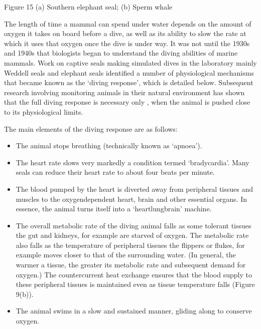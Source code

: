 \documentclass[letterpaper,10pt,english]{sphinxmanual}
\let\sphinxpxdimen\pdfpxdimen\else\newdimen\sphinxpxdimen
\begin{document}
\sphinxincludegraphics[width=512\sphinxpxdimen,height=141\sphinxpxdimen]{{s182_11_figure_13_composite}.jpg}

Figure 15 (a) Southern elephant seal; (b) Sperm whale

The length of time a mammal can spend under water depends on the amount of oxygen it takes on board before a dive, as well as its ability to slow the rate at which it uses that oxygen once the dive is under way. It was not until the 1930s and 1940s that biologists began to understand the diving abilities of marine mammals. Work on captive seals making simulated dives in the laboratory \textendash{} mainly Weddell seals and elephant seals \textendash{} identified a number of physiological mechanisms that became known as
the ‘diving response’, which is detailed below. Subsequent research involving monitoring animals in their natural environment has shown that the full diving response is necessary only , when the animal is pushed close to its physiological limits.

The main elements of the diving response are as follows:
\begin{itemize}
\item {} 
The animal stops breathing (technically known as ‘apnoea’).

\item {} 
The heart rate slows very markedly \textendash{} a condition termed ‘bradycardia’. Many seals can reduce their heart rate to about four beats per minute.

\item {} 
The blood pumped by the heart is diverted away from peripheral tissues and muscles to the oxygen\sphinxhyphen{}dependent heart, brain and other essential organs. In essence, the animal turns itself into a ‘heart\sphinxhyphen{}lung\sphinxhyphen{}brain’ machine.

\item {} 
The overall metabolic rate of the diving animal falls as some tolerant tissues \textendash{} the gut and kidneys, for example \textendash{} are starved of oxygen. The metabolic rate also falls as the temperature of peripheral tissues \textendash{} the flippers or flukes, for example \textendash{} moves closer to that of the surrounding water. (In general, the warmer a tissue, the greater its metabolic rate and subsequent demand for oxygen.) The countercurrent heat exchange ensures that the blood supply to these peripheral tissues is
maintained even as tissue temperature falls (Figure 9(b)).

\item {} 
The animal swims in a slow and sustained manner, gliding along to conserve oxygen.

\end{itemize}
\end{document}
